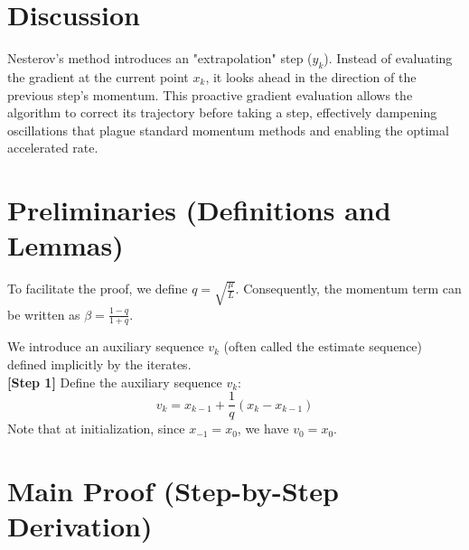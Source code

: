 \documentclass[11pt]{article}
\begin{document}
\section*{Discussion}
Nesterov's method introduces an "extrapolation" step ($y_k$). Instead of evaluating the gradient at the current point $x_k$, it looks ahead in the direction of the previous step's momentum. This proactive gradient evaluation allows the algorithm to correct its trajectory before taking a step, effectively dampening oscillations that plague standard momentum methods and enabling the optimal accelerated rate.

\section*{Preliminaries (Definitions and Lemmas)}
To facilitate the proof, we define $q = \sqrt{\frac{\mu}{L}}$. Consequently, the momentum term can be written as $\beta = \frac{1-q}{1+q}$.

We introduce an auxiliary sequence $v_k$ (often called the estimate sequence) defined implicitly by the iterates.
\\[1em]
\textbf{[Step 1]} Define the auxiliary sequence $v_k$:
$$v_k = x_{k-1} + \frac{1}{q} (x_k - x_{k-1})$$
Note that at initialization, since $x_{-1} = x_0$, we have $v_0 = x_0$.

\section*{Main Proof (Step-by-Step Derivation)}
\end{document}
